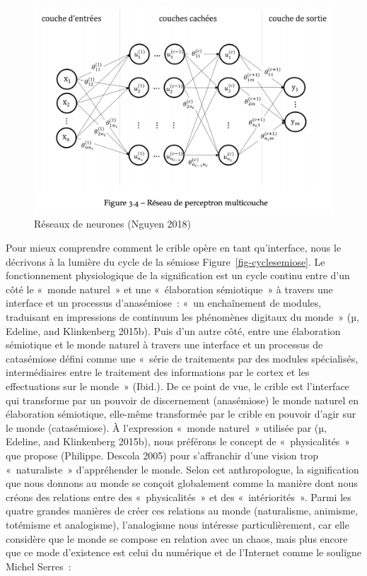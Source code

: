 \documentclass[
  letterpaper,
  DIV=11,
  numbers=noendperiod]{scrreprt}
\begin{document}
\begin{figure}

{\centering \includegraphics{images/reseaux-neurones.png}

}

\caption{Réseaux de neurones (Nguyen 2018)}

\end{figure}

Pour mieux comprendre comment le crible opère en tant qu'interface, nous
le décrivons à la lumière du cycle de la sémiose
Figure~\ref{fig-cyclesemiose}. Le fonctionnement physiologique de la
signification est un cycle continu entre d'un côté le «~monde naturel~»
et une «~élaboration sémiotique~» à travers une interface et un
processus d'anasémiose~: «~un enchaînement de modules, traduisant en
impressions de continuum les phénomènes digitaux du monde~» (µ, Edeline,
and Klinkenberg 2015b). Puis d'un autre côté, entre une élaboration
sémiotique et le monde naturel à travers une interface et un processus
de catasémiose défini comme une «~série de traitements par des modules
spécialisés, intermédiaires entre le traitement des informations par le
cortex et les effectuations sur le monde~» (Ibid.). De ce point de vue,
le crible est l'interface qui transforme par un pouvoir de discernement
(anasémiose) le monde naturel en élaboration sémiotique, elle-même
transformée par le crible en pouvoir d'agir sur le monde (catasémiose).
À l'expression «~monde naturel~» utilisée par (µ, Edeline, and
Klinkenberg 2015b), nous préférons le concept de «~physicalités~» que
propose (Philippe. Descola 2005) pour s'affranchir d'une vision trop
«~naturaliste~» d'appréhender le monde. Selon cet anthropologue, la
signification que nous donnons au monde se conçoit globalement comme la
manière dont nous créons des relations entre des «~physicalités~» et des
«~intériorités~». Parmi les quatre grandes manières de créer ces
relations au monde (naturalisme, animisme, totémisme et analogisme),
l'analogisme nous intéresse particulièrement, car elle considère que le
monde se compose en relation avec un chaos, mais plus encore que ce mode
d'existence est celui du numérique et de l'Internet comme le souligne
Michel Serres~:
\end{document}
